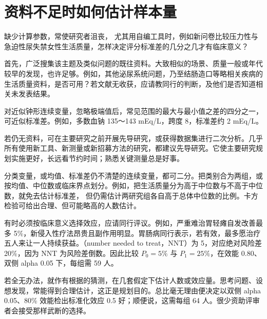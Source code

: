 \section{资料不足时如何估计样本量}
缺少计算参数，常使研究者沮丧，
尤其用自编工具时，例如新问卷比较压力性与急迫性尿失禁女性生活质量，怎样决定评分标准差的几分之几才有临床意义？

首先，广泛搜集该主题及类似问题的既往资料。大致相似的场景、质量一般或年代较早的发现，也许足够。例如，其他泌尿系统问题，乃至结肠造口等略相关疾病的生活质量资料，是否可用？若文献无收获，应请教同行的判断，及他们是否知道相关未发表结果。

对近似钟形连续变量，忽略极端值后，常见范围的最大与最小值之差的四分之一，可近似标准差。例如，多数血钠 135～143 mEq/L，跨度 8，标准差约 2 mEq/L。

若仍无资料，可在主要研究之前开展先导研究，或获得数据集进行二次分析。几乎所有使用新工具、新测量或新招募方法的研究，都建议先导研究。它使主要研究规划实施更好，长远看节约时间；熟悉关键测量总是好事。

分类变量，或均值、标准差仍不清楚的连续变量，都可二分。把类别合为两组，或按均值、中位数或临床界点划分。例如，把生活质量分为高于中位数与不高于中位数，就免去估计标准差，
但仍需估计两研究组各自高于总体中位数的比例。卡方检验可给出合理、但可能略高的人数估计。

有时必须按临床意义选择效应，应请同行评议。例如，严重难治胃轻瘫自发改善最多 5\%，新侵入性疗法昂贵且副作用明显。胃肠病同行表示，若有效，最多愿治疗五人来让一人持续获益。（number needed to treat，NNT）为 5，对应绝对风险差 20\%，因为 NNT 为风险差倒数。因此比较 $P_0=5\%$ 与 $P_1=25\%$，在效能 0.80、双侧 alpha 0.05 下，每组需 59 人。

若全无办法，就作有根据的猜测，在几套假定下估计人数或效应量。思考问题、设想发现，常能得到合理估计，这正是规划目的。总比毫无理由便决定以双侧 alpha 0.05、80\% 效能检出标准化效应 0.5 好；顺便说，这需每组 64 人。很少资助评审者会接受那样武断的选择。

